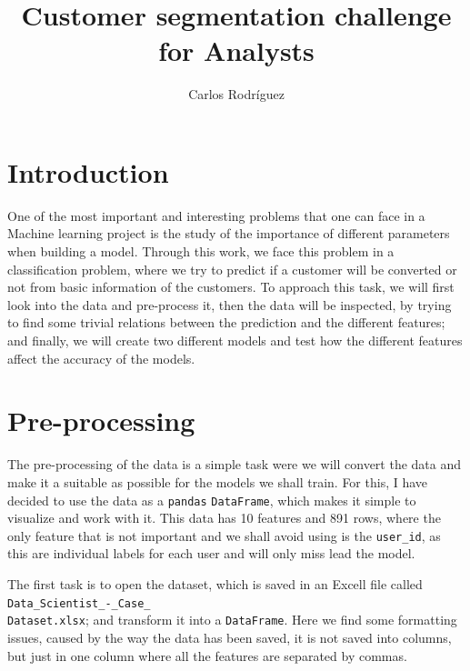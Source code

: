 \documentclass{article}
\title{Customer segmentation challenge for Analysts}
\author{Carlos Rodríguez}
\begin{document}
\maketitle


\section{Introduction}

One of the most important and interesting problems that one can face in a Machine learning project is the study of the importance of different parameters when building a model. Through this work, we face this problem in a classification problem, where we try to predict if a customer will be converted or not from basic information of the customers. To approach this task, we will first look into the data and pre-process it, then the data will be inspected, by trying to find some trivial relations between the prediction and the different features; and finally, we will create two different models and test how the different features affect the accuracy of the models. 

\section{Pre-processing}

The pre-processing of the data is a simple task were we will convert the data and make it a suitable as possible for the models we shall train. For this, I have decided to use the data as a \texttt{pandas} \texttt{DataFrame}, which makes it simple to visualize and work with it. This data has 10 features and 891 rows, where the only feature that is not important and we shall avoid using is the \texttt{user\_id}, as this are individual labels for each user and will only miss lead the model.

The first task is to open the dataset, which is saved in an Excell file called \texttt{Data\_Scientist\_-\_Case\_\\Dataset.xlsx}; and transform it into a \texttt{DataFrame}. Here we find some formatting issues, caused by the way the data has been saved, it is not saved into columns, but just in one column where all the features are separated by commas. 
\end{document}
